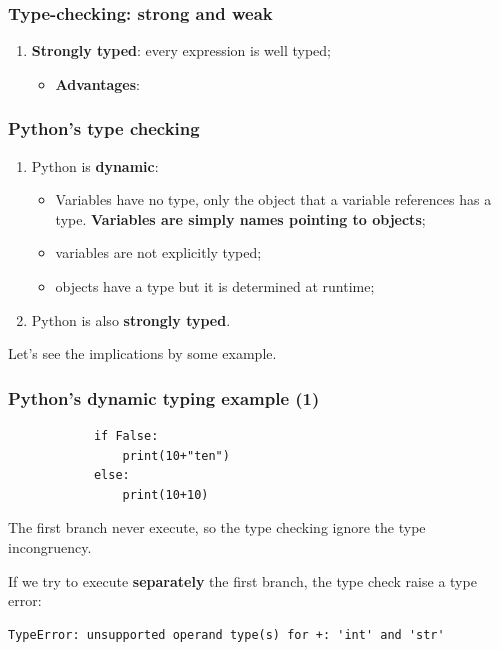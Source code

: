 \documentclass[xcolor ={table,usenames,dvipsnames}]{beamer}
\theoremstyle{definition}
\begin{document}
\begin{frame}
	\frametitle{Type-checking: strong and weak}
	\begin{enumerate}
		\item \textbf{Strongly typed}: every expression is well typed;
			\begin{itemize}
				\item \textbf{Advantages}: 
			\end{itemize}
	\end{enumerate}
	
\end{frame}

	\begin{frame}
		\frametitle{Python's type checking}
			\begin{enumerate}
				\item Python is \textbf{dynamic}: 
				\begin{itemize}
					\item Variables have no type, only the object that a variable references has a type. \textbf{Variables are simply names pointing to objects};
					\item variables are not explicitly typed;
					\item objects have a type but it is determined at runtime;
				\end{itemize}
				\item Python is also \textbf{strongly typed}.
			\end{enumerate}
			
			Let's see the implications by some example.
	\end{frame}

	\begin{frame}[fragile]
		\frametitle{Python's dynamic typing example (1)}
			\begin{lstlisting} 
			if False:
				print(10+"ten") 
			else:
				print(10+10)
			\end{lstlisting}
			The first branch never execute, so the type checking ignore the type incongruency.
			
			If we try to execute \textbf{separately} the first branch, the type check raise a type error:
			
			\begin{lstlisting}[keywordstyle=\color{black},
			commentstyle=\color{black},
			stringstyle=\color{black}.]
			TypeError: unsupported operand type(s) for +: 'int' and 'str'
			\end{lstlisting}
	\end{frame}
\end{document}
